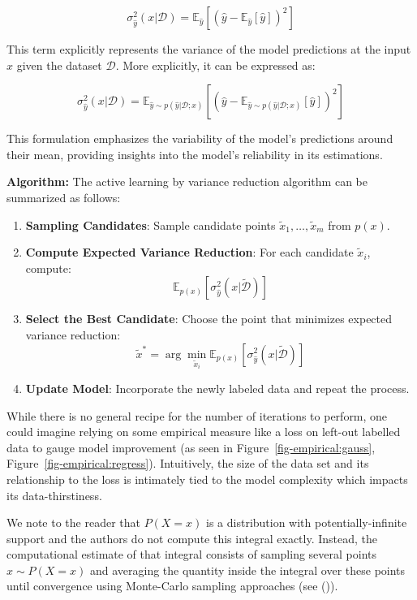 \documentclass[
  letterpaper,
  numbers=noenddot,
  DIV=11,
  oneside]{scrreprt}
\providecommand{\tightlist}{%
  \setlength{\itemsep}{0pt}\setlength{\parskip}{0pt}}\usepackage{longtable,booktabs,array}
\theoremstyle{remark}
\begin{document}
\[
\sigma^2_{\hat{y}} (x | \mathcal{D}) = \mathbb{E}_{\hat{y}} [(\hat{y} - \mathbb{E}_{\hat{y}}[\hat{y}])^2]
\]

This term explicitly represents the variance of the model predictions at
the input \(x\) given the dataset \(\mathcal{D}\). More explicitly, it
can be expressed as:

\[
\sigma^2_{\hat{y}} (x | \mathcal{D}) =  \mathbb{E}_{\hat{y} \sim p(\hat{y} | \mathcal{D}; x)} [(\hat{y} - \mathbb{E}_{\hat{y} \sim p(\hat{y} | \mathcal{D}; x)}[\hat{y}])^2]
\]

This formulation emphasizes the variability of the model's predictions
around their mean, providing insights into the model's reliability in
its estimations.

\textbf{Algorithm:} The active learning by variance reduction algorithm
can be summarized as follows:

\begin{enumerate}
\def\labelenumi{\arabic{enumi}.}
\tightlist
\item
  \textbf{Sampling Candidates}: Sample candidate points
  \(\tilde{x}_1, \dots, \tilde{x}_m\) from \(p(x)\).
\item
  \textbf{Compute Expected Variance Reduction}: For each candidate
  \(\tilde{x}_i\), compute: \[
  \mathbb{E}_{p(x)} [\sigma^2_{\hat{y}} (x | \tilde{\mathcal{D}})]
  \]
\item
  \textbf{Select the Best Candidate}: Choose the point that minimizes
  expected variance reduction: \[
     \tilde{x}^* = \arg\min_{\tilde{x}_i} \mathbb{E}_{p(x)} [\sigma^2_{\hat{y}} (x | \tilde{\mathcal{D}})]
  \]
\item
  \textbf{Update Model}: Incorporate the newly labeled data and repeat
  the process.
\end{enumerate}

While there is no general recipe for the number of iterations to
perform, one could imagine relying on some empirical measure like a loss
on left-out labelled data to gauge model improvement (as seen in
Figure~\ref{fig-empirical:gauss}, Figure~\ref{fig-empirical:regress}).
Intuitively, the size of the data set and its relationship to the loss
is intimately tied to the model complexity which impacts its
data-thirstiness.

We note to the reader that \(P(X=x)\) is a distribution with
potentially-infinite support and the authors do not compute this
integral exactly. Instead, the computational estimate of that integral
consists of sampling several points \(x \sim P(X=x)\) and averaging the
quantity inside the integral over these points until convergence using
Monte-Carlo sampling approaches (see ()).
\end{document}
